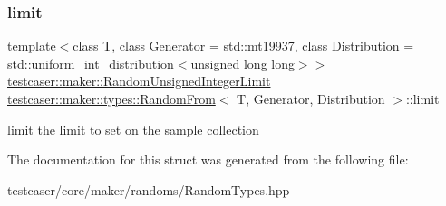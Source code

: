 \subsubsection{\texorpdfstring{limit}{limit}}
{\footnotesize\ttfamily template$<$class T, class Generator = std\+::mt19937, class Distribution = std\+::uniform\+\_\+int\+\_\+distribution$<$unsigned long long$>$$>$ \\
\mbox{\hyperlink{classtestcaser_1_1maker_1_1RandomUnsignedIntegerLimit}{testcaser\+::maker\+::\+Random\+Unsigned\+Integer\+Limit}} \mbox{\hyperlink{structtestcaser_1_1maker_1_1types_1_1RandomFrom}{testcaser\+::maker\+::types\+::\+Random\+From}}$<$ T, Generator, Distribution $>$\+::limit}



limit the limit to set on the sample collection 



The documentation for this struct was generated from the following file\+:\begin{DoxyCompactItemize}
\item 
testcaser/core/maker/randoms/Random\+Types.\+hpp\end{DoxyCompactItemize}
